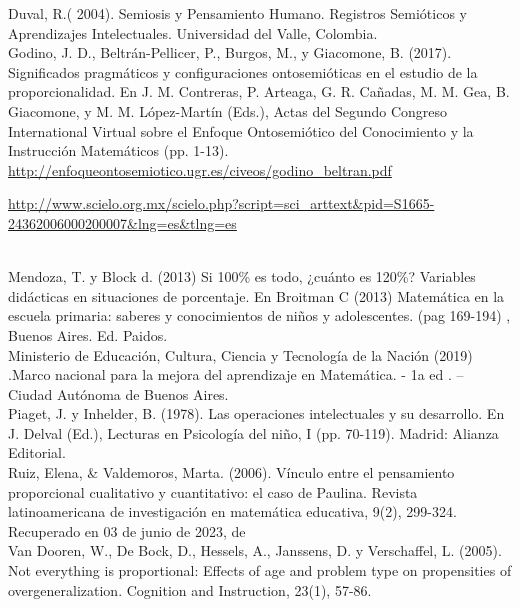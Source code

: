 \documentclass[oneside,spanish]{amsart}
\numberwithin{equation}{section}
\numberwithin{figure}{section}
\begin{document}
Duval, R.( 2004). Semiosis y Pensamiento Humano. Registros Semióticos y Aprendizajes Intelectuales. Universidad del Valle, Colombia.\\

Godino, J. D., Beltrán-Pellicer, P., Burgos, M., y Giacomone, B. (2017). Significados pragmáticos y configuraciones ontosemióticas en el estudio de la proporcionalidad. En J. M. Contreras, P. Arteaga, G. R. Cañadas, M. M. Gea, B. Giacomone, y M. M. López-Martín (Eds.), Actas del Segundo Congreso International Virtual sobre el Enfoque Ontosemiótico del Conocimiento y la Instrucción Matemáticos (pp. 1-13). 
\href{http://enfoqueontosemiotico.ugr.es/civeos/godino_ beltran.pdf}{http://enfoqueontosemiotico.ugr.es/civeos/godino\_beltran.pdf}\\

\begin{minipage}{1\linewidth}
  \url{http://www.scielo.org.mx/scielo.php?script=sci_arttext&pid=S1665-24362006000200007&lng=es&tlng=es}
\end{minipage}
\\

Mendoza, T. y Block d. (2013) Si 100\% es todo, ¿cuánto es 120\%? Variables didácticas en situaciones de porcentaje. En Broitman C (2013) Matemática en la escuela primaria: saberes y conocimientos de niños y adolescentes. (pag 169-194) , Buenos Aires. Ed. Paidos.\\

Ministerio de Educación, Cultura, Ciencia y Tecnología de la Nación  (2019) .Marco nacional para la mejora del aprendizaje en Matemática. - 1a ed . – Ciudad Autónoma de Buenos Aires.\\

Piaget, J. y Inhelder, B. (1978). Las operaciones intelectuales y su desarrollo. En J. Delval (Ed.),
Lecturas en Psicología del niño, I (pp. 70-119). Madrid: Alianza Editorial.\\

Ruiz, Elena, \& Valdemoros, Marta. (2006). Vínculo entre el pensamiento proporcional cualitativo y cuantitativo: el caso de Paulina. Revista latinoamericana de investigación en matemática educativa, 9(2), 299-324. Recuperado en 03 de junio de 2023, de\\

Van Dooren, W., De Bock, D., Hessels, A., Janssens, D. y Verschaffel, L. (2005). Not everything is proportional: Effects of age and problem type on propensities of overgeneralization. Cognition and Instruction, 23(1), 57-86.
\end{document}
